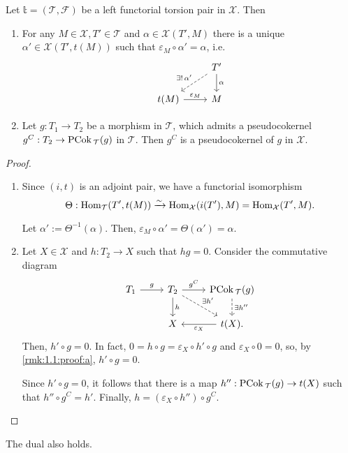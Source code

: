 \begin{rmk}\label{rmk:1.1}
  Let $\mathbb{t}=(\mathcal{T},\mathcal{F})$ be a left functorial torsion pair in $\mathcal{X}$.
  Then
  \begin{enumerate}[label=(\alph*)]
    \item\label{rmk:1.1a} For any $M\in\mathcal{X}, T'\in\mathcal{T}$ and $\alpha\in\mathcal{X}(T',M)$ there
    is a unique $\alpha'\in\mathcal{X}(T',t(M))$ such that $\varepsilon_M\circ\alpha'=\alpha$, i.e.
    \begin{equation*}
      \begin{tikzcd}
        & T'\arrow[dashed]{ld}[']{\exists!\,\alpha'}\arrow{d}{\alpha}\\
        t(M)\arrow{r}{\varepsilon_M}&M
      \end{tikzcd}
    \end{equation*}
    \item\label{rmk:1.1b} Let $g:T_1\to T_2$ be a morphism in $\mathcal{T}$, which admits a pseudocokernel
    $g^C:T_2\to\mathrm{\textup{PCok\,}}_\mathcal{T}(g)$ in $\mathcal{T}$. Then $g^C$ is a pseudocokernel of $g$
    in $\mathcal{X}$.
  \end{enumerate}
\end{rmk}

\begin{proof}
  \begin{enumerate}[label=(\alph*)]
    \item\label{rmk:1.1:proof:a}  Since $(i,t)$ is an adjoint pair, we have a functorial isomorphism
      \begin{equation*}
        \Theta:\mathrm{Hom}_{\mathcal{T}}(T',t(M))\xrightarrow{\sim}\mathrm{Hom}_{\mathcal{X}}(i(T'),M)=\mathrm{Hom}_{\mathcal{X}}(T',M).
      \end{equation*}

      Let $\alpha':=\Theta^{-1}(\alpha)$. Then, $\varepsilon_M\circ \alpha'=\Theta(\alpha')=\alpha$.
    \item Let $X\in\mathcal{X}$ and $h:T_2\to X$ such that $hg=0$. Consider the commutative diagram
    \begin{equation*}
      \begin{tikzcd}
        T_1\arrow{r}{g}
          & T_2\arrow{r}{g^C}\arrow{d}{h}\arrow[dashed]{dr}{\exists h'}
            & \PCok_\mathcal{T}(g)\arrow[dashed]{d}{\exists h''}\\
          & X
            & t(X)\arrow{l}{\varepsilon_X}.
      \end{tikzcd}
    \end{equation*}
    Then, $h'\circ g=0$. In fact, $0=h\circ g=\varepsilon_X \circ h' \circ g$
    and $\varepsilon_X\circ 0=0$, so, by \ref{rmk:1.1:proof:a}, $h'\circ g=0$.

    Since $h'\circ g=0$, it follows that there is a map $h'':\mathrm{\textup{PCok\,}}_\mathcal{T}(g)\to t(X)$
    such that $h''\circ g^C=h'$. Finally, $h=(\varepsilon_X\circ h'')\circ g^C$.
  \end{enumerate}
\end{proof}

The dual also holds.
